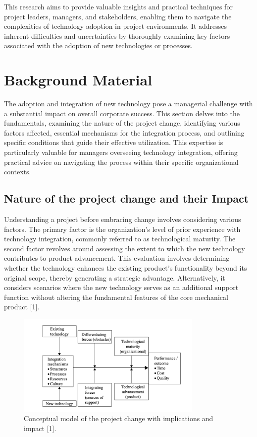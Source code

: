 \documentclass{article}
\begin{document}
\noindent This research aims to provide valuable insights and practical techniques for project leaders, managers, and stakeholders, enabling them to navigate the complexities of technology adoption in project environments. It addresses inherent difficulties and uncertainties by thoroughly examining key factors associated with the adoption of new technologies or processes.

\section{Background Material}
The adoption and integration of new technology pose a managerial challenge with a substantial impact on overall corporate success. This section delves into the fundamentals, examining the nature of the project change, identifying various factors affected, essential mechanisms for the integration process, and outlining specific conditions that guide their effective utilization. This expertise is particularly valuable for managers overseeing technology integration, offering practical advice on navigating the process within their specific organizational contexts.


\subsection{Nature of the project change and their Impact}
Understanding a project before embracing change involves considering various factors. The primary factor is the organization's level of prior experience with technology integration, commonly referred to as technological maturity. The second factor revolves around assessing the extent to which the new technology contributes to product advancement. This evaluation involves determining whether the technology enhances the existing product's functionality beyond its original scope, thereby generating a strategic advantage. Alternatively, it considers scenarios where the new technology serves as an additional support function without altering the fundamental features of the core mechanical product [1].


\begin{figure}[h]
    \centering
    \includegraphics[width=0.8\textwidth]{Figure1.png}
    \caption{Conceptual model of the project change with implications and impact [1].}
    \label{fig:conceptual-model}
\end{figure}
\end{document}
